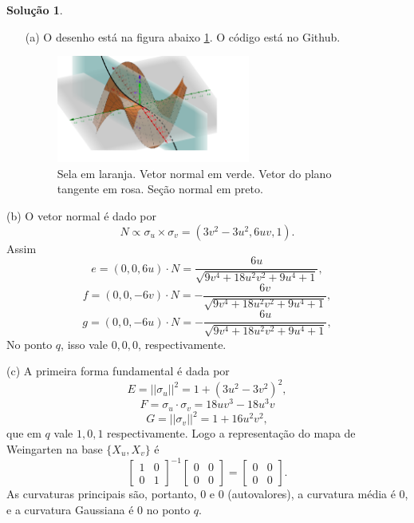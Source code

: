 \documentclass[a4paper,12pt]{article}
\theoremstyle{exer}
\theoremstyle{definition}
\newtheorem{solution}{Solução}
\theoremstyle{plain}
\begin{document}
\begin{solution}
    \begin{enumerate}
        \item[(a)] O desenho está na figura abaixo \ref{fig:sela}. O
        código está no Github. 
        
        \begin{figure}[!ht]
            \centering
            \includegraphics[width=0.6\textwidth]{images/sela.png}
            \caption{Sela em laranja. Vetor normal em verde. Vetor do plano tangente em rosa. Seção normal em preto.}
            \label{fig:sela}
        \end{figure}
    \end{enumerate}

    \item[(b)] O vetor normal é dado por 
    $$
    N \propto \sigma_u \times \sigma_v = (3v^2-3u^2 , 6uv, 1).
    $$
    Assim
    $$
    e = (0,0,6u)\cdot N = \frac{6u}{\sqrt{9v^4+18u^2v^2 + 9u^4+1}},
    $$
    $$
    f = (0,0,-6v)\cdot N = -\frac{6v}{\sqrt{9v^4+18u^2v^2 + 9u^4+1}},
    $$
    $$
    g = (0,0,-6u)\cdot N = -\frac{6u}{\sqrt{9v^4+18u^2v^2 + 9u^4+1}},
    $$
    No ponto $q$, isso vale $0,0,0$, respectivamente. 

    \item[(c)] A primeira forma fundamental é dada por 
    $$
    E = ||\sigma_u||^2 = 1 + (3u^2 - 3v^2)^2, 
    $$
    $$
    F = \sigma_u \cdot \sigma_v = 18uv^3 - 18u^3v
    $$
    $$
    G = ||\sigma_v||^2 = 1 + 16u^2v^2, 
    $$
    que em $q$ vale $1,0,1$ respectivamente. Logo a representação do mapa de
    Weingarten na base $\{X_u, X_v\}$ é 
    $$
    \begin{bmatrix}
        1 & 0 \\ 0 & 1
    \end{bmatrix}^{-1}\begin{bmatrix}
        0 & 0 \\ 0 & 0 
    \end{bmatrix} = \begin{bmatrix}
        0 & 0 \\ 0 & 0 
    \end{bmatrix}.
    $$
    As curvaturas principais são, portanto, $0$ e $0$ (autovalores), a
    curvatura média é 0, e a curvatura Gaussiana é 0 no ponto $q$. 
\end{solution}
\end{document}
